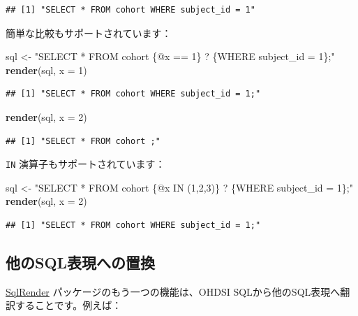 \documentclass[
  11pt]{book}
\newenvironment{Shaded}{\begin{snugshade}}{\end{snugshade}}
\newcommand{\AttributeTok}[1]{\textcolor[rgb]{0.13,0.29,0.53}{#1}}
\newcommand{\DecValTok}[1]{\textcolor[rgb]{0.00,0.00,0.81}{#1}}
\newcommand{\FunctionTok}[1]{\textcolor[rgb]{0.13,0.29,0.53}{\textbf{#1}}}
\newcommand{\NormalTok}[1]{#1}
\newcommand{\OtherTok}[1]{\textcolor[rgb]{0.56,0.35,0.01}{#1}}
\newcommand{\StringTok}[1]{\textcolor[rgb]{0.31,0.60,0.02}{#1}}
\theoremstyle{definition}
\theoremstyle{definition}
\theoremstyle{definition}
\theoremstyle{definition}
\theoremstyle{remark}
\begin{document}
\begin{verbatim}
## [1] "SELECT * FROM cohort WHERE subject_id = 1"
\end{verbatim}

簡単な比較もサポートされています：

\begin{Shaded}
\begin{Highlighting}[]
\NormalTok{sql }\OtherTok{\textless{}{-}} \StringTok{"SELECT * FROM cohort \{@x == 1\} ? \{WHERE subject\_id = 1\};"}
\FunctionTok{render}\NormalTok{(sql, }\AttributeTok{x =} \DecValTok{1}\NormalTok{)}
\end{Highlighting}
\end{Shaded}

\begin{verbatim}
## [1] "SELECT * FROM cohort WHERE subject_id = 1;"
\end{verbatim}

\begin{Shaded}
\begin{Highlighting}[]
\FunctionTok{render}\NormalTok{(sql, }\AttributeTok{x =} \DecValTok{2}\NormalTok{)}
\end{Highlighting}
\end{Shaded}

\begin{verbatim}
## [1] "SELECT * FROM cohort ;"
\end{verbatim}

\texttt{IN} 演算子もサポートされています：

\begin{Shaded}
\begin{Highlighting}[]
\NormalTok{sql }\OtherTok{\textless{}{-}} \StringTok{"SELECT * FROM cohort \{@x IN (1,2,3)\} ? \{WHERE subject\_id = 1\};"}
\FunctionTok{render}\NormalTok{(sql, }\AttributeTok{x =} \DecValTok{2}\NormalTok{)}
\end{Highlighting}
\end{Shaded}

\begin{verbatim}
## [1] "SELECT * FROM cohort WHERE subject_id = 1;"
\end{verbatim}

\subsection{他のSQL表現への置換}\label{ux4ed6ux306esqlux8868ux73feux3078ux306eux7f6eux63db}

\href{https://ohdsi.github.io/SqlRender/}{SqlRender} パッケージのもう一つの機能は、OHDSI SQLから他のSQL表現へ翻訳することです。例えば：
\end{document}
